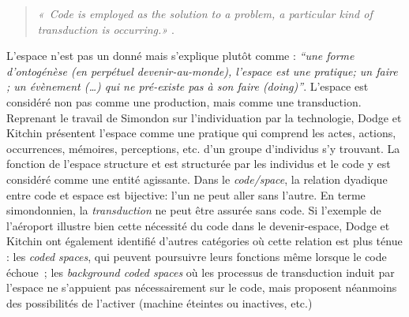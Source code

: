 \begin{quote}
    \textit{« Code is employed as the solution to a problem, a particular kind of transduction  is occurring.»} \citep{Kitchin2011}. 
\end{quote}

L’espace n’est pas un donné mais s’explique plutôt comme : \textit{“une forme d’ontogénèse (en perpétuel devenir-au-monde), l’espace est une pratique; un faire ; un évènement (…) qui ne pré-existe pas à son faire (doing)”}. L’espace est considéré non pas comme une production, mais comme une transduction. Reprenant le travail de Simondon sur l’individuation par la technologie, Dodge et Kitchin présentent l’espace comme une pratique qui comprend les actes, actions, occurrences, mémoires, perceptions, etc. d’un groupe d’individus s’y trouvant. La fonction de l’espace structure et est structurée par les individus et le code y est considéré comme une entité agissante. Dans le \textit{code/space}, la relation dyadique entre code et espace est bijective: l’un ne peut aller sans l’autre. En terme simondonnien, la \textit{transduction} ne peut être assurée sans code. Si l’exemple de l’aéroport illustre bien cette nécessité du code dans le devenir-espace, Dodge et Kitchin ont également identifié d’autres catégories où cette relation est plus ténue : les \textit{coded spaces}, qui peuvent poursuivre leurs fonctions même lorsque le code échoue ; les \textit{background coded spaces} où les processus de transduction induit par l’espace ne s’appuient pas nécessairement sur le code, mais proposent néanmoins des possibilités de l’activer (machine éteintes ou inactives, etc.) 

